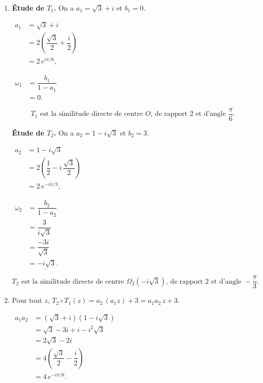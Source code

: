 \documentclass[12pt,a4paper]{article}
\begin{document}
\begin{enumerate}

    \item \textbf{Étude de $T_1$.} On a $a_1 = \sqrt3 + i$ et $b_1 = 0$.

    $
    \begin{aligned}
    a_1 &= \sqrt3 + i \\[1mm]
        &= 2\left(\dfrac{\sqrt3}{2}+\dfrac{i}{2}\right) \\[1mm]
        &= 2\,e^{i\pi/6},
    \end{aligned}
    $

    $
    \begin{aligned}
    \omega_1 &= \dfrac{b_1}{1-a_1} \\[1mm]
             &= 0.
    \end{aligned}
    $

    \[
    \boxed{T_1 \text{ est la similitude directe de centre } O \text{, de rapport } 2 \text{ et d'angle } \dfrac{\pi}{6}.}
    \]

    \textbf{Étude de $T_2$.} On a $a_2 = 1 - i\sqrt3$ et $b_2 = 3$.

    $
    \begin{aligned}
    a_2 &= 1 - i\sqrt3 \\[1mm]
        &= 2\left(\dfrac12 - i\,\dfrac{\sqrt3}{2}\right) \\[1mm]
        &= 2\,e^{-i\pi/3},
    \end{aligned}
    $

    $
    \begin{aligned}
    \omega_2 &= \dfrac{b_2}{1-a_2} \\[1mm]
             &= \dfrac{3}{i\sqrt3} \\[1mm]
             &= \dfrac{-3i}{\sqrt3} \\[1mm]
             &= -i\sqrt3.
    \end{aligned}
    $

    \[
    \boxed{T_2 \text{ est la similitude directe de centre } \Omega_2(-i\sqrt3) \text{, de rapport } 2 \text{ et d'angle } -\dfrac{\pi}{3}.}
    \]

    \item Pour tout $z$, $T_2\circ T_1(z) = a_2\,(a_1 z) + 3 = a_1 a_2\, z + 3$.

    $
    \begin{aligned}
    a_1 a_2 &= (\sqrt3 + i)(1 - i\sqrt3) \\[1mm]
            &= \sqrt3 - 3i + i - i^2\sqrt3 \\[1mm]
            &= 2\sqrt3 - 2i \\[1mm]
            &= 4\left(\dfrac{\sqrt3}{2} - \dfrac{i}{2}\right) \\[1mm]
            &= 4\,e^{-i\pi/6}.
    \end{aligned}
    $


\end{enumerate}
\end{document}
